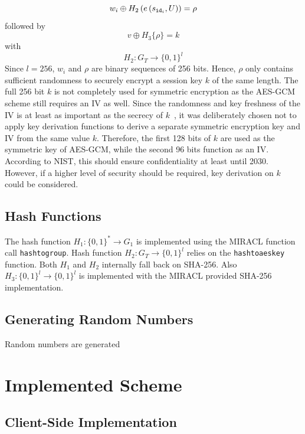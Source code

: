 \begin{equation*}
 w_i \oplus H_2 \left( e \left( s_{\mathtt{id}_{i}}, U \right) \right) = \rho
\end{equation*}
followed by
\begin{equation*}
 v \oplus H_3 \{ \rho \} = k
\end{equation*}
with
\begin{equation*}
 H_2: G_T \rightarrow \{ 0,1 \}^{l}
\end{equation*}
Since $l=256$, $w_i$ and $\rho$ are binary sequences of 256 bits. Hence, $\rho$ only contains sufficient randomness to securely encrypt a session key $k$ of the same length. The full 256 bit $k$ is not completely used for symmetric encryption as the AES-GCM scheme still requires an IV as well. Since the randomness and key freshness of the IV is at least as important as the secrecy of $k$~\cite{nist:dworkin}, it was deliberately chosen not to apply key derivation functions to derive a separate symmetric encryption key and IV from the same value $k$. Therefore, the first 128 bits of $k$ are used as the symmetric key of AES-GCM, while the second 96 bits function as an IV. According to NIST, this should ensure confidentiality at least until 2030. However, if a higher level of security should be required, key derivation on $k$ could be considered.

\subsection{Hash Functions}
The hash function $H_1: \{ 0,1 \}^{*} \rightarrow G_1$ is implemented using the MIRACL function call \texttt{hash\textunderscore to\textunderscore group}. Hash function $H_2: G_T \rightarrow \{ 0,1 \}^{l}$ relies on the \texttt{hash\textunderscore to\textunderscore aes\textunderscore key} function. Both $H_1$ and $H_2$ internally fall back on SHA-256. Also $H_3: \{ 0, 1 \}^{l} \rightarrow \{ 0,1 \}^{l}$ is implemented with the MIRACL provided SHA-256 implementation.

\subsection{Generating Random Numbers}
Random numbers are generated 

\section{Implemented Scheme}

\subsection{Client-Side Implementation}

